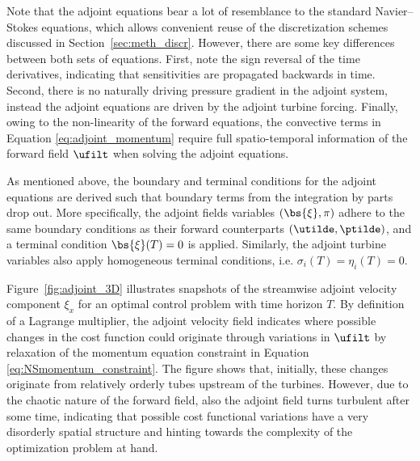 	Note that the adjoint equations bear a lot of resemblance to the standard Navier--Stokes equations, which allows convenient reuse of the discretization schemes discussed in Section~\ref{sec:meth_discr}. However, there are some key differences between both sets of equations. First, note the sign reversal of the time derivatives, indicating that sensitivities are propagated backwards in time. Second, there is no naturally driving pressure gradient in the adjoint system, instead the adjoint equations are driven by the adjoint turbine forcing. Finally, owing to the non-linearity of the forward equations, the convective terms in Equation \eqref{eq:adjoint_momentum} require full spatio-temporal information of the forward field $\ufilt$ when solving the adjoint equations.
	
	As mentioned above, the boundary and terminal conditions for the adjoint equations are derived such that boundary terms from the integration by parts drop out. More specifically, the adjoint fields variables $(\bs{\xi}, \pi)$ adhere to the same boundary conditions as their forward counterparts $(\utilde, \ptilde)$, and a terminal condition $\bs{\xi}(T) = 0$ is applied. Similarly, the adjoint turbine variables also apply homogeneous terminal conditions, i.e. $\sigma_i(T) = \eta_i(T) = 0$. 
	
	Figure~\ref{fig:adjoint_3D} illustrates snapshots of the streamwise adjoint velocity component $\xi_x$ for an optimal control problem with time horizon $T$. By definition of a Lagrange multiplier, the adjoint velocity field indicates where possible changes in the cost function could originate through variations in $\ufilt$ by relaxation of the momentum equation constraint in Equation \eqref{eq:NSmomentum_constraint}. The figure shows that, initially, these changes originate from relatively orderly tubes upstream of the turbines. However, due to the chaotic nature of the forward field, also the adjoint field turns turbulent after some time, indicating that possible cost functional variations have a very disorderly spatial structure and hinting towards the complexity of the optimization problem at hand.
	
